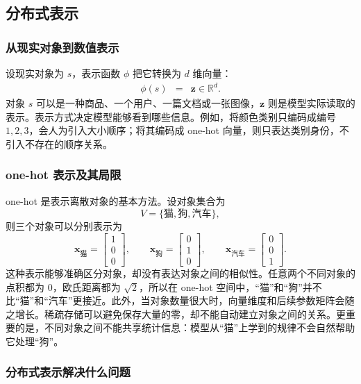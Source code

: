 \subsection{分布式表示}

\subsubsection{从现实对象到数值表示}

设现实对象为 $s$，表示函数 $\phi$ 把它转换为 $d$ 维向量：
\begin{eqnarray}
\phi(s) &=& \mathbf{z}\in\mathbb{R}^{d}.
\end{eqnarray}
对象 $s$ 可以是一种商品、一个用户、一篇文档或一张图像，$\mathbf{z}$ 则是模型实际读取的表示。表示方式决定模型能够看到哪些信息。例如，将颜色类别只编码成编号 $1,2,3$，会人为引入大小顺序；将其编码成 one-hot 向量，则只表达类别身份，不引入不存在的顺序关系。

\subsubsection{one-hot 表示及其局限}

one-hot 是表示离散对象的基本方法。设对象集合为
\[
V=\{\text{猫},\text{狗},\text{汽车}\},
\]
则三个对象可以分别表示为
\[
\mathbf{x}_{\text{猫}}=
\begin{bmatrix}1\\0\\0\end{bmatrix},
\qquad
\mathbf{x}_{\text{狗}}=
\begin{bmatrix}0\\1\\0\end{bmatrix},
\qquad
\mathbf{x}_{\text{汽车}}=
\begin{bmatrix}0\\0\\1\end{bmatrix}.
\]
这种表示能够准确区分对象，却没有表达对象之间的相似性。任意两个不同对象的点积都为 0，欧氏距离都为 $\sqrt{2}$，所以在 one-hot 空间中，“猫”和“狗”并不比“猫”和“汽车”更接近。此外，当对象数量很大时，向量维度和后续参数矩阵会随之增长。稀疏存储可以避免保存大量的零，却不能自动建立对象之间的关系。更重要的是，不同对象之间不能共享统计信息：模型从“猫”上学到的规律不会自然帮助它处理“狗”。

\subsubsection{分布式表示解决什么问题}


